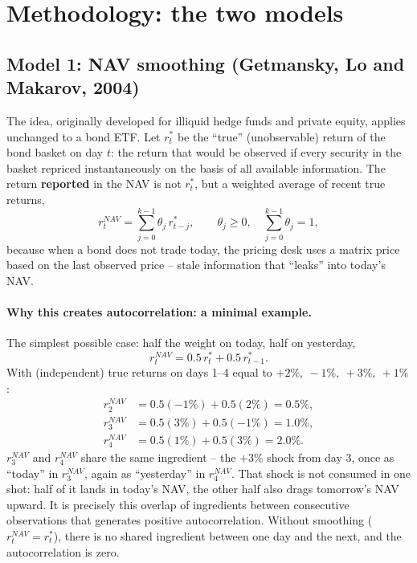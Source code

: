 \documentclass[11pt]{article}
\begin{document}
\section{Methodology: the two models}
\label{sec:models}

\subsection{Model 1: NAV smoothing (Getmansky, Lo and Makarov, 2004)}
\label{sec:model1}

The idea, originally developed for illiquid hedge funds and private equity, applies unchanged to a bond ETF. Let $r^\ast_t$ be the ``true'' (unobservable) return of the bond basket on day $t$: the return that would be observed if every security in the basket repriced instantaneously on the basis of all available information. The return \textbf{reported} in the NAV is not $r^\ast_t$, but a weighted average of recent true returns,
\[
r^{NAV}_t = \sum_{j=0}^{k-1} \theta_j\, r^\ast_{t-j}, \qquad \theta_j \ge 0,\quad \sum_{j=0}^{k-1}\theta_j = 1,
\]
because when a bond does not trade today, the pricing desk uses a matrix price based on the last observed price -- stale information that ``leaks'' into today's NAV.

\paragraph{Why this creates autocorrelation: a minimal example.} The simplest possible case: half the weight on today, half on yesterday,
\[
r^{NAV}_t = 0.5\, r^\ast_t + 0.5\, r^\ast_{t-1}.
\]
With (independent) true returns on days 1--4 equal to $+2\%,\ -1\%,\ +3\%,\ +1\%$:
\begin{align*}
r^{NAV}_2 &= 0.5(-1\%)+0.5(2\%) = 0.5\%, \\
r^{NAV}_3 &= 0.5(3\%)+0.5(-1\%) = 1.0\%, \\
r^{NAV}_4 &= 0.5(1\%)+0.5(3\%) = 2.0\%.
\end{align*}
$r^{NAV}_3$ and $r^{NAV}_4$ share the same ingredient -- the $+3\%$ shock from day 3, once as ``today'' in $r^{NAV}_3$, again as ``yesterday'' in $r^{NAV}_4$. That shock is not consumed in one shot: half of it lands in today's NAV, the other half also drags tomorrow's NAV upward. It is precisely this overlap of ingredients between consecutive observations that generates positive autocorrelation. Without smoothing ($r^{NAV}_t = r^\ast_t$), there is no shared ingredient between one day and the next, and the autocorrelation is zero.
\end{document}

